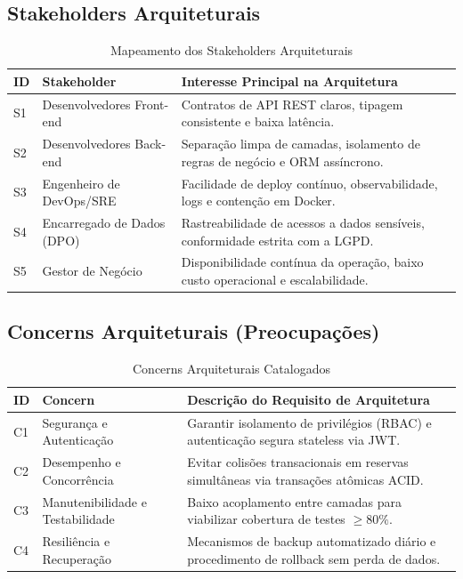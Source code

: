 \subsection{Stakeholders Arquiteturais}
\begin{table}[htbp]
\caption{Mapeamento dos Stakeholders Arquiteturais}
\label{tab:stakeholders_arquitetura}
\centering
\small
\begin{tabularx}{\textwidth}{@{} l l Y @{}}
\toprule
\textbf{ID} & \textbf{Stakeholder} & \textbf{Interesse Principal na Arquitetura} \\
\midrule
S1 & Desenvolvedores Front-end & Contratos de API REST claros, tipagem consistente e baixa latência. \\
S2 & Desenvolvedores Back-end & Separação limpa de camadas, isolamento de regras de negócio e ORM assíncrono. \\
S3 & Engenheiro de DevOps/SRE & Facilidade de deploy contínuo, observabilidade, logs e contenção em Docker. \\
S4 & Encarregado de Dados (DPO) & Rastreabilidade de acessos a dados sensíveis, conformidade estrita com a LGPD. \\
S5 & Gestor de Negócio & Disponibilidade contínua da operação, baixo custo operacional e escalabilidade. \\
\bottomrule
\end{tabularx}
\end{table}

\subsection{Concerns Arquiteturais (Preocupações)}
\begin{table}[htbp]
\caption{Concerns Arquiteturais Catalogados}
\label{tab:concerns_arquitetura}
\centering
\small
\begin{tabularx}{\textwidth}{@{} l l Y @{}}
\toprule
\textbf{ID} & \textbf{Concern} & \textbf{Descrição do Requisito de Arquitetura} \\
\midrule
C1 & Segurança e Autenticação & Garantir isolamento de privilégios (RBAC) e autenticação segura stateless via JWT. \\
C2 & Desempenho e Concorrência & Evitar colisões transacionais em reservas simultâneas via transações atômicas ACID. \\
C3 & Manutenibilidade e Testabilidade & Baixo acoplamento entre camadas para viabilizar cobertura de testes $\ge 80\%$. \\
C4 & Resiliência e Recuperação & Mecanismos de backup automatizado diário e procedimento de rollback sem perda de dados. \\
\bottomrule
\end{tabularx}
\end{table}

